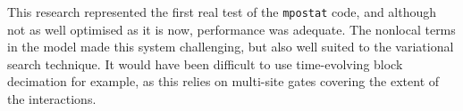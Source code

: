 This research represented the first real test of the \lstinline$mpostat$ code, and although not as well optimised as it is now, performance was adequate. The nonlocal terms in the model made this system challenging, but also well suited to the variational search technique. It would have been difficult to use time-evolving block decimation for example, as this relies on multi-site gates covering the extent of the interactions.